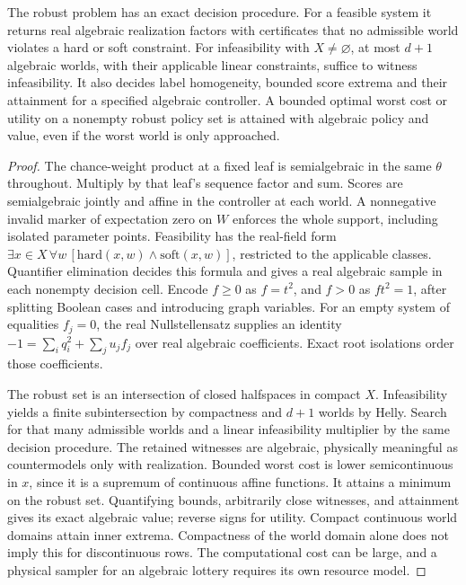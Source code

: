 \begin{theorem}\label{adv:g011}
The robust problem has an exact decision procedure. For a feasible system it returns real algebraic realization factors with certificates that no admissible world violates a hard or soft constraint. For infeasibility with \(X\ne\varnothing\), at most \(d+1\) algebraic worlds, with their applicable linear constraints, suffice to witness infeasibility. It also decides label homogeneity, bounded score extrema and their attainment for a specified algebraic controller. A bounded optimal worst cost or utility on a nonempty robust policy set is attained with algebraic policy and value, even if the worst world is only approached.
\end{theorem}
\begin{proof}
The chance-weight product at a fixed leaf is semialgebraic in the same \(\theta\) throughout. Multiply by that leaf's sequence factor and sum. Scores are semialgebraic jointly and affine in the controller at each world. A nonnegative invalid marker of expectation zero on \(W\) enforces the whole support, including isolated parameter points. Feasibility has the real-field form \(\exists x\in X\,\forall w\,[\mathrm{hard}(x,w)\wedge\mathrm{soft}(x,w)]\), restricted to the applicable classes. Quantifier elimination decides this formula and gives a real algebraic sample in each nonempty decision cell. Encode \(f\ge0\) as \(f=t^2\), and \(f>0\) as \(ft^2=1\), after splitting Boolean cases and introducing graph variables. For an empty system of equalities \(f_j=0\), the real Nullstellensatz supplies an identity \(-1=\sum_i q_i^2+\sum_j u_j f_j\) over real algebraic coefficients. Exact root isolations order those coefficients.

The robust set is an intersection of closed halfspaces in compact \(X\). Infeasibility yields a finite subintersection by compactness and \(d+1\) worlds by Helly. Search for that many admissible worlds and a linear infeasibility multiplier by the same decision procedure. The retained witnesses are algebraic, physically meaningful as countermodels only with realization. Bounded worst cost is lower semicontinuous in \(x\), since it is a supremum of continuous affine functions. It attains a minimum on the robust set. Quantifying bounds, arbitrarily close witnesses, and attainment gives its exact algebraic value; reverse signs for utility. Compact continuous world domains attain inner extrema. Compactness of the world domain alone does not imply this for discontinuous rows. The computational cost can be large, and a physical sampler for an algebraic lottery requires its own resource model.
\end{proof}

